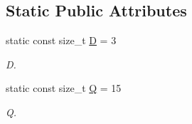 \subsection*{Static Public Attributes}
\begin{DoxyCompactItemize}
\item 
\hypertarget{classnatrium_1_1D3Q15_aa2ad749b590c354b4e1dde4691cfd17f}{
static const size\_\-t \hyperlink{classnatrium_1_1D3Q15_aa2ad749b590c354b4e1dde4691cfd17f}{D} = 3}
\label{classnatrium_1_1D3Q15_aa2ad749b590c354b4e1dde4691cfd17f}

\begin{DoxyCompactList}\small\item\em D. \item\end{DoxyCompactList}\item 
\hypertarget{classnatrium_1_1D3Q15_a9e84d98e74ad1e4316a7a1d0db8da4fc}{
static const size\_\-t \hyperlink{classnatrium_1_1D3Q15_a9e84d98e74ad1e4316a7a1d0db8da4fc}{Q} = 15}
\label{classnatrium_1_1D3Q15_a9e84d98e74ad1e4316a7a1d0db8da4fc}

\begin{DoxyCompactList}\small\item\em Q. \item\end{DoxyCompactList}\end{DoxyCompactItemize}
